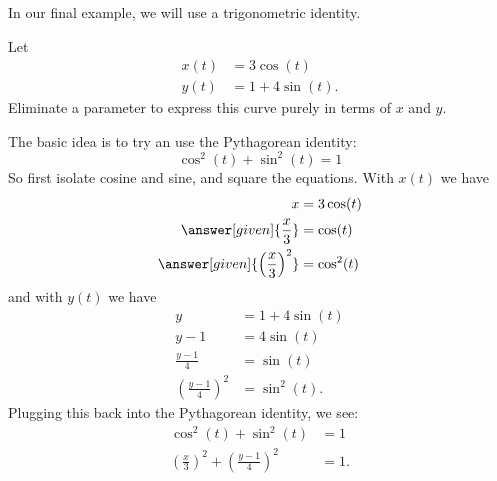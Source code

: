 \documentclass{ximera}
\begin{document}
In our final example, we will use a trigonometric identity.

\begin{example}
  Let
  \begin{align*}
    x(t) &= 3\cos(t)\\
    y(t) &= 1+4\sin(t).
  \end{align*}
  Eliminate a parameter to express this curve purely in terms of $x$ and $y$.
  \begin{explanation}
    The basic idea is to try an use the Pythagorean identity:
    \[
    \cos^2(t) + \sin^2(t) = 1
    \]
    So first isolate cosine and sine, and square the equations. With $x(t)$ we have
    \begin{align*}
      x &= 3 \cos(t) \\
      \answer[given]{\frac{x}{3}} &= \cos(t)\\
      \answer[given]{\left(\frac{x}{3}\right)^2} &= \cos^2(t)
    \end{align*}
    and with $y(t)$ we have
    \begin{align*}
      y &= 1 + 4\sin(t)\\
      y-1 &= 4\sin(t)\\
      \frac{y-1}{4} &= \sin(t)\\
      \left(\frac{y-1}{4}\right)^2 &= \sin^2(t).
    \end{align*}
    Plugging this back into the Pythagorean identity, we see:
    \begin{align*}
      \cos^2(t) + \sin^2(t) &= 1\\
      \left(\frac{x}{3}\right)^2 + \left(\frac{y-1}{4}\right)^2 &= 1.
    \end{align*}
  \end{explanation}
\end{example}
\end{document}
